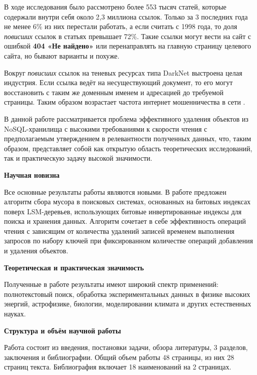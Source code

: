 В ходе исследования было рассмотрено более 553 тысяч статей, которые содержали
внутри себя около 2,3 миллиона ссылок. Только за 3 последних года не менее 6\%
из них перестали работать, а если считать с 1998 года, то доля \textit{повисших}
ссылок в статьях превышает 72\%. Такие ссылки могут вести на сайт с
ошибкой \textbf{404 «Не найдено»} или перенаправлять на главную страницу целевого
сайта, но бывают варианты и похуже.

Вокруг \textit{повисших} ссылок на теневых ресурсах типа DarkNet выстроена целая
индустрия. Если ссылка ведёт на несуществующий документ, то его могут восстановить
с таким же доменным именем и адресацией до требуемой страницы. Таким образом
возрастает частота интернет мошенничества в сети \cite{Fraud}.

В данной работе рассматривается проблема эффективного удаления объектов из
NoSQL-хранилища с высокими требованиями к скорости чтения с предполагаемым
утверждением в релевантности полученных данных, что, таким образом, представляет
собой как открытую область теоретических исследований, так и практическую задачу
высокой значимости.

\textbf{Научная новизна}

Все основные результаты работы являются новыми. В работе предложен алгоритм
сбора мусора в поисковых системах, основанных на битовых индексах
поверх LSM-деревьев, использующих битовые инвертированные индексы для поиска и
хранения данных. Алгоритм сочетает в себе эффективность операций чтения с
зависящим от количества удалений записей временем выполнения запросов по
набору ключей при фиксированном количестве операций добавления и удаления
объектов.

\textbf{Теоретическая и практическая значимость}

Полученные в работе результаты имеют широкий спектр применений: полнотекстовый поиск,
обработка экспериментальных данных в физике высоких энергий, астрофизике, биологии,
моделировании климата и других естественных науках.

\textbf{Структура и объём научной работы}

Работа состоит из введения, постановки задачи, обзора литературы, 3
разделов, заключения и библиографии. Общий объем работы 48 страницы, из
них 28 страниц текста. Библиография включает 18 наименований на 2 страницах.
